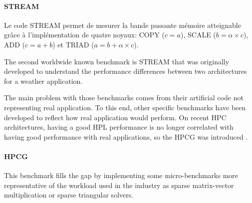 \paragraph{STREAM} Le code STREAM permet de mesurer la bande passante mémoire atteignable grâce à l'implémentation de quatre noyaux: COPY ($c=a$), SCALE ($b=\alpha \times c$), ADD ($c=a+b$) et TRIAD ($a=b+\alpha \times c$).


The second worldwide known benchmark is STREAM \cite{HPC:stream} that was originally developed to understand the performance differences between two architectures for a weather application.

The main problem with those benchmarks comes from their artificial code not representing real application. To this end, other specific benchmarks have been developed to reflect how real application would perform. On recent HPC architectures, having a good HPL performance is no longer correlated with having good performance with real applications, so the HPCG was introduced \cite{HPC:hpcg}. 

\paragraph{HPCG} This benchmark fills the gap by implementing some micro-benchmarks more representative of the workload used in the industry as sparse matrix-vector multiplication or sparse triangular solvers.